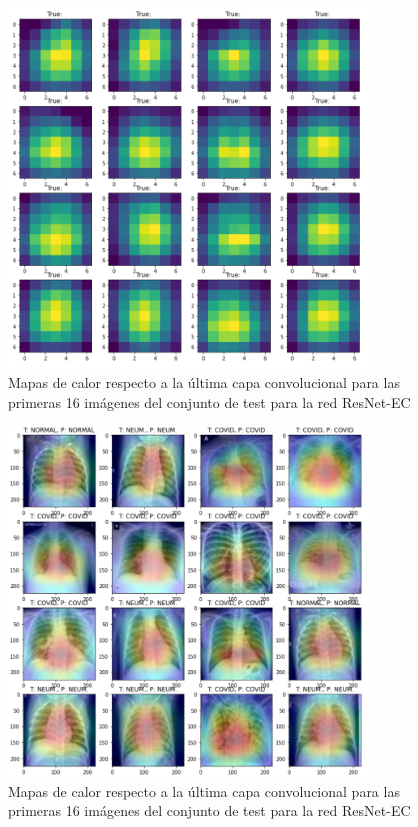 \documentclass[11pt,a4paper]{article}
\theoremstyle{definition}
\begin{document}
\begin{figure}[]
\centering
\includegraphics[width=0.85\textwidth]{./images/xceptionfilters}
\caption{Mapas de calor respecto a la última capa convolucional para las primeras 16 imágenes del conjunto de test para la red ResNet-EC}
\end{figure}

\begin{figure}[]
\centering
\includegraphics[width=0.85\textwidth]{./images/heatmapxception}
\caption{Mapas de calor respecto a la última capa convolucional para las primeras 16 imágenes del conjunto de test para la red ResNet-EC}
\end{figure}
\end{document}
